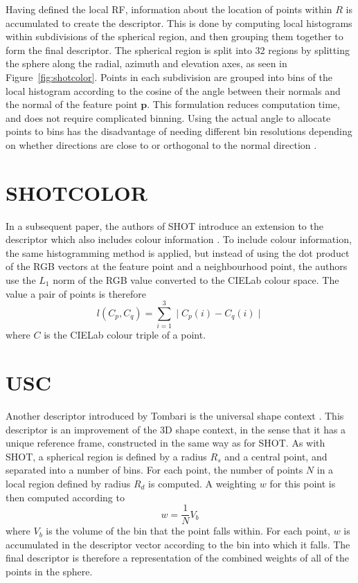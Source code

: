\documentclass[11pt,a4paper]{kth-mag}
\begin{document}
Having defined the local RF, information about the location of points within $R$
is accumulated to create the descriptor. This is done by computing local
histograms within subdivisions of the spherical region, and then grouping them
together to form the final descriptor. The spherical region is split into 32
regions by splitting the sphere along the radial, azimuth and elevation axes, as
seen in Figure~\ref{fig:shotcolor}. Points in each subdivision are grouped into
bins of the local histogram according to the cosine of the angle between their
normals and the normal of the feature point $\mathbf{p}$. This formulation
reduces computation time, and does not require complicated binning. Using the
actual angle to allocate points to bins has the disadvantage of needing
different bin resolutions depending on whether directions are close to or
orthogonal to the normal direction \cite{tombari2010unique}.

\section{SHOTCOLOR}
In a subsequent paper, the authors of SHOT introduce an extension to the
descriptor which also includes colour information \cite{tombari2011combined}. To
include colour information, the same histogramming method is applied, but
instead of using the dot product of the RGB vectors at the feature point and a
neighbourhood point, the authors use the $L_1$ norm of the RGB value converted
to the CIELab colour space. The value a pair of points is therefore
\begin{equation}
  \label{eq:17}
  l(C_p, C_q)=\sum^3_{i=1}\mid C_p(i)-C_q(i)\mid
\end{equation}
where $C$ is the CIELab colour triple of a point.

\section{USC}
Another descriptor introduced by Tombari is the universal shape context
\cite{tombari2010uniquesc}. This descriptor is an improvement of the 3D shape
context, in the sense that it has a unique reference frame, constructed in the
same way as for SHOT. As with SHOT, a spherical region is defined by a radius
$R_s$ and a central point, and separated into a number of bins. For each point,
the number of points $N$ in a local region defined by radius $R_d$ is computed.
A weighting $w$ for this point is then computed according to
\begin{equation}
  \label{eq:18}
  w=\frac{1}{N}V_b
\end{equation}
where $V_b$ is the volume of the bin that the point falls within. For each
point, $w$ is accumulated in the descriptor vector according to the bin into
which it falls. The final descriptor is therefore a representation of the
combined weights of all of the points in the sphere.
\end{document}
